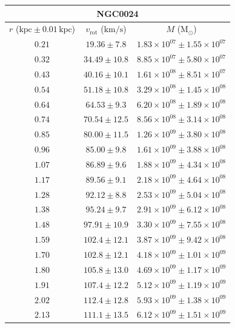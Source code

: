 \documentclass{article}
\newcommand\solmass{\textrm{M}_\odot}
\newcommand\kpc{\textrm{kpc}}
\newcommand\kmps{\textrm{km}/\textrm{s}}
\newcommand\vrot{\ensuremath{v_{\textrm{rot}}}}
\begin{document}
\begin{table}[h!]
    \begin{tabular}{|c|c|c|}
        \hline
        \multicolumn{3}{|c|}{NGC0024} \\
        \hline
        $r$ ($\kpc \pm 0.01 \,\kpc$) & $\vrot$ ($\kmps$) & $M$ ($\solmass$) \\
        \hline
        $0.21$ & $19.36 \pm 7.8$ & $1.83\times 10^{07} \pm 1.55\times 10^{07}$ \\
        $0.32$ & $34.49 \pm 10.8$ & $8.85\times 10^{07} \pm 5.80\times 10^{07}$ \\
        $0.43$ & $40.16 \pm 10.1$ & $1.61\times 10^{08} \pm 8.51\times 10^{07}$ \\
        $0.54$ & $51.18 \pm 10.8$ & $3.29\times 10^{08} \pm 1.45\times 10^{08}$ \\
        $0.64$ & $64.53 \pm 9.3$ & $6.20\times 10^{08} \pm 1.89\times 10^{08}$ \\
        $0.74$ & $70.54 \pm 12.5$ & $8.56\times 10^{08} \pm 3.14\times 10^{08}$ \\
        $0.85$ & $80.00 \pm 11.5$ & $1.26\times 10^{09} \pm 3.80\times 10^{08}$ \\
        $0.96$ & $85.00 \pm 9.8$ & $1.61\times 10^{09} \pm 3.88\times 10^{08}$ \\
        $1.07$ & $86.89 \pm 9.6$ & $1.88\times 10^{09} \pm 4.34\times 10^{08}$ \\
        $1.17$ & $89.56 \pm 9.1$ & $2.18\times 10^{09} \pm 4.64\times 10^{08}$ \\
        $1.28$ & $92.12 \pm 8.8$ & $2.53\times 10^{09} \pm 5.04\times 10^{08}$ \\
        $1.38$ & $95.24 \pm 9.7$ & $2.91\times 10^{09} \pm 6.12\times 10^{08}$ \\
        $1.48$ & $97.91 \pm 10.9$ & $3.30\times 10^{09} \pm 7.55\times 10^{08}$ \\
        $1.59$ & $102.4 \pm 12.1$ & $3.87\times 10^{09} \pm 9.42\times 10^{08}$ \\
        $1.70$ & $102.8 \pm 12.1$ & $4.18\times 10^{09} \pm 1.01\times 10^{09}$ \\
        $1.80$ & $105.8 \pm 13.0$ & $4.69\times 10^{09} \pm 1.17\times 10^{09}$ \\
        $1.91$ & $107.4 \pm 12.2$ & $5.12\times 10^{09} \pm 1.19\times 10^{09}$ \\
        $2.02$ & $112.4 \pm 12.8$ & $5.93\times 10^{09} \pm 1.38\times 10^{09}$ \\
        $2.13$ & $111.1 \pm 13.5$ & $6.12\times 10^{09} \pm 1.51\times 10^{09}$ \\

\end{tabular}
\end{table}
\end{document}
